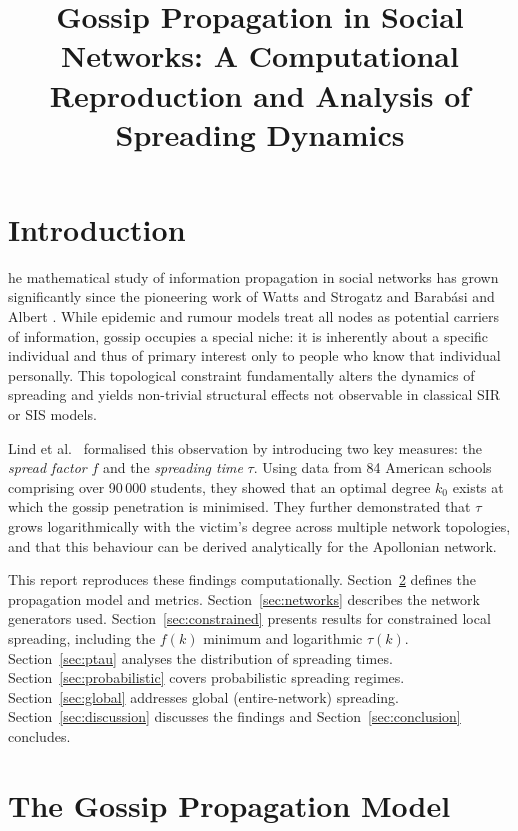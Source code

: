 \documentclass[9pt,a4paper,twocolumn,twoside]{tau-class/tau}
\title{Gossip Propagation in Social Networks: A Computational Reproduction and Analysis of Spreading Dynamics}
\begin{document}
\maketitle
\thispagestyle{firststyle}

\section{Introduction}

he mathematical study of information propagation in social networks has grown significantly since the pioneering work of Watts and Strogatz \cite{watts1998} and Barab\'asi and Albert \cite{barabasi1999}. While epidemic and rumour models treat all nodes as potential carriers of information, gossip occupies a special niche: it is inherently about a specific individual and thus of primary interest only to people who know that individual personally. This topological constraint fundamentally alters the dynamics of spreading and yields non-trivial structural effects not observable in classical SIR or SIS models.

Lind et al.\ \cite{lind2007epl,lind2007pre} formalised this observation by introducing two key measures: the \textit{spread factor} $f$ and the \textit{spreading time} $\tau$. Using data from 84 American schools comprising over 90\,000 students, they showed that an optimal degree $k_0$ exists at which the gossip penetration is minimised. They further demonstrated that $\tau$ grows logarithmically with the victim's degree across multiple network topologies, and that this behaviour can be derived analytically for the Apollonian network.

This report reproduces these findings computationally. Section~\ref{sec:model} defines the propagation model and metrics. Section~\ref{sec:networks} describes the network generators used. Section~\ref{sec:constrained} presents results for constrained local spreading, including the $f(k)$ minimum and logarithmic $\tau(k)$. Section~\ref{sec:ptau} analyses the distribution of spreading times. Section~\ref{sec:probabilistic} covers probabilistic spreading regimes. Section~\ref{sec:global} addresses global (entire-network) spreading. Section~\ref{sec:discussion} discusses the findings and Section~\ref{sec:conclusion} concludes.

\section{The Gossip Propagation Model}\label{sec:model}
\end{document}
